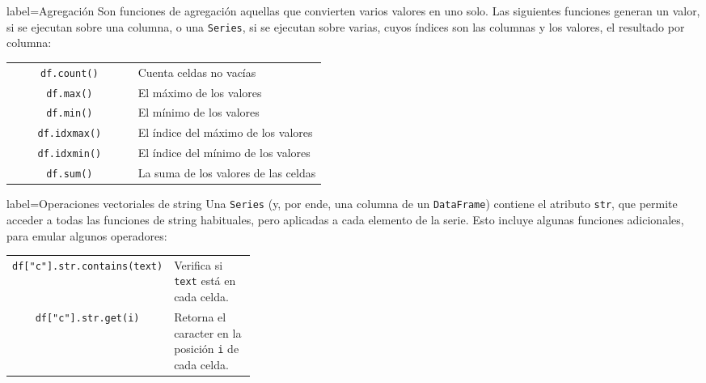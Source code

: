 \begin{contentbox}{label=Agregación}
    Son \alert{funciones de agregación} aquellas que convierten varios valores en uno solo. Las siguientes funciones generan un valor, si se ejecutan sobre una columna, o una \texttt{Series}, si se ejecutan sobre varias, cuyos índices son las columnas y los valores, el resultado por columna:
    
    \begin{tabular}{C|p{0.6\linewidth}}
        \lstinline!df.count()! & Cuenta celdas no vacías \\
        \lstinline!df.max()! &  El máximo de los valores \\
        \lstinline!df.min()! & El mínimo de los valores \\
        \lstinline!df.idxmax()! &  El índice del máximo de los valores \\
        \lstinline!df.idxmin()! & El índice del mínimo de los valores \\
        \lstinline!df.sum()! & La suma de los valores de las celdas
    \end{tabular}
\end{contentbox}

\begin{contentbox}{label=Operaciones vectoriales de string}
    Una \texttt{Series} (y, por ende, una columna de un \texttt{DataFrame}) contiene el atributo \texttt{str}, que permite acceder a todas las funciones de string habituales, pero aplicadas a cada elemento de la serie. Esto incluye algunas funciones adicionales, para emular algunos operadores:
    
    \begin{tabular}{C|p{0.35\linewidth}}
        \lstinline!df["c"].str.contains(text)! & Verifica si \texttt{text} está en cada celda. \\
        \lstinline!df["c"].str.get(i)! &  Retorna el caracter en la posición \texttt{i} de cada celda.
    \end{tabular}
\end{contentbox}
